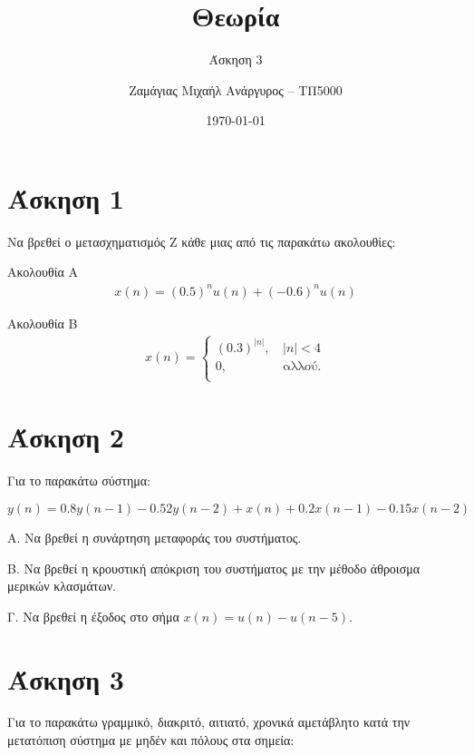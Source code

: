 \documentclass[12pt]{turabian-researchpaper}
\title{Θεωρία}
\subtitle{Άσκηση 3}
\author{Ζαμάγιας Μιχαήλ Ανάργυρος -- ΤΠ5000}
\date{\today}
\begin{document}
\begin{titlepage}
    \maketitle
\end{titlepage}

\tableofcontents

\newpage\section{Άσκηση 1}
Να βρεθεί ο μετασχηματισμός Ζ κάθε μιας από τις παρακάτω ακολουθίες:


Ακολουθία A
\begin{equation*}
    \begin{aligned}
        x(n) = (0.5)^n u(n) + (-0.6)^n u(n)
    \end{aligned}
\end{equation*}

Ακολουθία B
\begin{equation*}
    \begin{aligned}
        x(n) = \begin{cases}
            (0.3)^{| n |} \text{, } & | n | < 4     \\
            0\text{, }              & \text{αλλού.} \\
        \end{cases}
    \end{aligned}
\end{equation*}

\section{Άσκηση 2}

Για το παρακάτω σύστημα:

$$ y(n) = 0.8y(n-1) - 0.52y(n-2) + x(n) + 0.2x(n-1) - 0.15x(n-2) $$

Α. Να βρεθεί η συνάρτηση μεταφοράς του συστήματος.

Β. Να βρεθεί η κρουστική απόκριση του συστήματος με την μέθοδο άθροισμα μερικών κλασμάτων.

Γ. Να βρεθεί η έξοδος στο σήμα $ x(n) = u(n) - u(n-5) $.

\section{Άσκηση 3}
Για το παρακάτω γραμμικό, διακριτό, αιτιατό,  χρονικά αμετάβλητο κατά την μετατόπιση σύστημα με μηδέν και πόλους στα σημεία:
\end{document}
